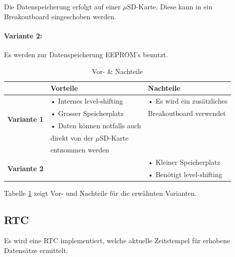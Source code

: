 Die Datenspeicherung erfolgt auf einer $\mu$SD-Karte. Diese kann in ein Breakoutboard eingeschoben werden.\\

\paragraph{Variante 2:}

Es werden zur Datenspeicherung EEPROM's benutzt.\\

\begin{table}[h]
  \centering
  \label{tab:datenspeicherung}
  \small
  \caption{Vor- \& Nachteile}
    \begin{tabular}{c|l|l}
          & \textbf{Vorteile} & \textbf{Nachteile} \\
    \toprule
    \multirow{4}[2]{*}{\textbf{Variante 1}} & • Internes level-shifting & • Es wird ein zusätzliches \\
          & • Grosser Speicherplatz & \hspace{0.3cm}Breakoutboard verwendet \\
          & • Daten können notfalls auch &  \\
          &   \hspace{0.3cm} direkt von der $\mu$SD-Karte &  \\
          &   \hspace{0.3cm} entnommen werden &  \\
    \hline
    \multirow{2}[1]{*}{\textbf{Variante 2}} &       & • Kleiner Speicherplatz \\
          &       & • Benötigt level-shifting \\
    \end{tabular}%
  \label{tab:Datenspeicherung}%
\end{table}%

Tabelle \ref{tab:Datenspeicherung} zeigt Vor- und Nachteile für die erwähnten Varianten.\\

\subsection{RTC}
Es wird eine RTC implementiert, welche aktuelle Zeitstempel für erhobene Datensätze ermittelt.\\

